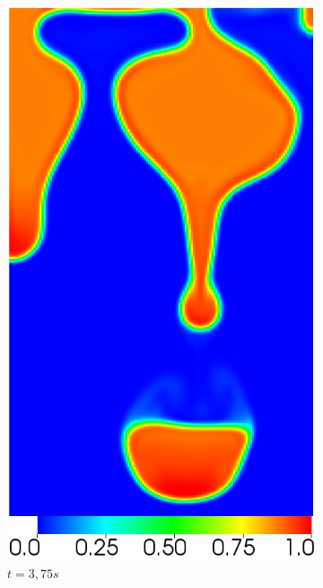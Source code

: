 \begin{figure}[H]
\begin{subfigure}[ht!]{0.2\textwidth}
		\includegraphics[width=1\textwidth]{figure/PT_RT/concent1/visit0005.png}
		\caption{$t=3,75s$}
	\end{subfigure}
	\begin{subfigure}[ht!]{0.2\textwidth}
		\centering

\end{subfigure}
\end{figure}
